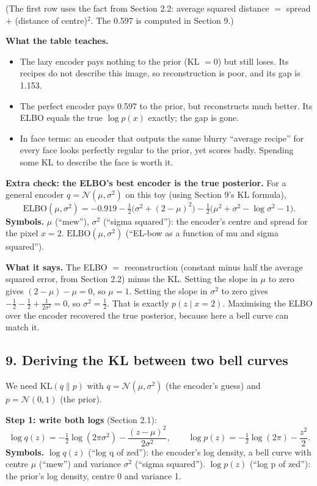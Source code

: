 (The first row uses the fact from Section 2.2: average squared distance $=$ spread $+$ (distance of centre)$^2$. The 0.597 is computed in Section 9.)

\textbf{What the table teaches.}
\begin{itemize}[leftmargin=1.5em]
\item The lazy encoder pays nothing to the prior (KL $=0$) but still loses. Its recipes do not describe this image, so reconstruction is poor, and its gap is 1.153.
\item The perfect encoder pays 0.597 to the prior, but reconstructs much better. Its ELBO equals the true $\log p(x)$ exactly; the gap is gone.
\item In face terms: an encoder that outputs the same blurry ``average recipe'' for every face looks perfectly regular to the prior, yet scores badly. Spending some KL to describe the face is worth it.
\end{itemize}

\textbf{Extra check: the ELBO's best encoder is the true posterior.} For a general encoder $q = \mathcal{N}(\mu, \sigma^2)$ on this toy (using Section 9's KL formula),
\[
\mathrm{ELBO}(\mu, \sigma^2) = -0.919 - \tfrac{1}{2}\big(\sigma^2 + (2 - \mu)^2\big) - \tfrac{1}{2}\big(\mu^2 + \sigma^2 - \log\sigma^2 - 1\big).
\]
\textbf{Symbols.} $\mu$ (``mew''), $\sigma^2$ (``sigma squared''): the encoder's centre and spread for the pixel $x = 2$. $\mathrm{ELBO}(\mu, \sigma^2)$ (``EL-bow as a function of mu and sigma squared'').

\textbf{What it says.} The ELBO $=$ reconstruction (constant minus half the average squared error, from Section 2.2) minus the KL. Setting the slope in $\mu$ to zero gives $(2 - \mu) - \mu = 0$, so $\mu = 1$. Setting the slope in $\sigma^2$ to zero gives $-\tfrac12 - \tfrac12 + \tfrac{1}{2\sigma^2} = 0$, so $\sigma^2 = \tfrac12$. That is exactly $p(z \mid x = 2)$. Maximising the ELBO over the encoder recovered the true posterior, because here a bell curve can match it.

\subsection*{9. Deriving the KL between two bell curves}

We need $\mathrm{KL}(q \| p)$ with $q = \mathcal{N}(\mu, \sigma^2)$ (the encoder's guess) and $p = \mathcal{N}(0, 1)$ (the prior).

\textbf{Step 1: write both logs} (Section 2.1):
\[
\log q(z) = -\tfrac{1}{2}\log(2\pi\sigma^2) - \frac{(z - \mu)^2}{2\sigma^2},
\qquad
\log p(z) = -\tfrac{1}{2}\log(2\pi) - \frac{z^2}{2}.
\]
\textbf{Symbols.} $\log q(z)$ (``log q of zed''): the encoder's log density, a bell curve with centre $\mu$ (``mew'') and variance $\sigma^2$ (``sigma squared''). $\log p(z)$ (``log p of zed''): the prior's log density, centre 0 and variance 1.

